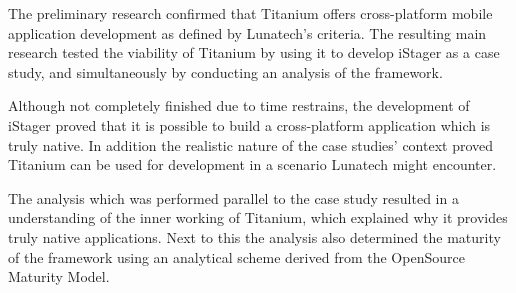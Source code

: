 


%
	
The preliminary research confirmed that Titanium offers cross-platform mobile application development as defined by Lunatech's criteria. The resulting main research tested the viability of Titanium by using it to develop iStager as a case study, and simultaneously by conducting an analysis of the framework.

Although not completely finished due to time restrains, the development of iStager proved that it is possible to build a cross-platform application which is truly native. In addition the realistic nature of the case studies' context proved Titanium can be used for development in a scenario Lunatech might encounter.

The analysis which was performed parallel to the case study resulted in a understanding of the inner working of Titanium, which explained why it provides truly native applications. Next to this the analysis also determined the maturity of the framework using an analytical scheme derived from the OpenSource Maturity Model. 

